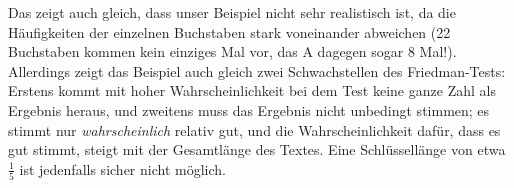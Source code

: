 \documentclass{zusammenfassung}
\begin{document}
Das zeigt auch gleich, dass unser Beispiel nicht sehr realistisch ist, da die Häufigkeiten der einzelnen Buchstaben stark
voneinander abweichen (22 Buchstaben kommen kein einziges Mal vor, das A dagegen sogar 8 Mal!). Allerdings zeigt das Beispiel auch
gleich zwei Schwachstellen des Friedman-Tests: Erstens kommt mit hoher Wahrscheinlichkeit bei dem Test keine ganze Zahl als
Ergebnis heraus, und zweitens muss das Ergebnis nicht unbedingt stimmen; es stimmt nur \emph{wahrscheinlich} relativ gut, und die
Wahrscheinlichkeit dafür, dass es gut stimmt, steigt mit der Gesamtlänge des Textes. Eine Schlüssellänge von etwa $\frac 15$ ist
jedenfalls sicher nicht möglich.
\end{document}
